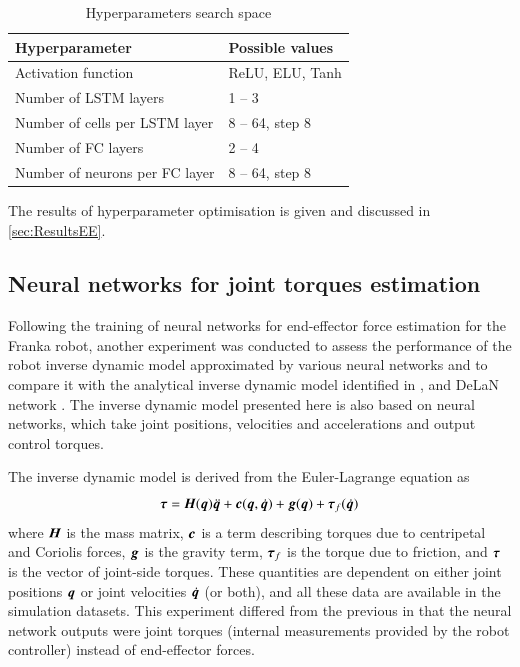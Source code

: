 \begin{table}
    \centering
    \caption{Hyperparameters search space}
    \label{tab:HPSearchSpace}
    \begin{tabular}{ll}
        \toprule
        \textbf{Hyperparameter} & \textbf{Possible values}\\
        \midrule
        Activation function & ReLU, ELU, Tanh \\
        Number of LSTM layers & 1 -- 3 \\ %
        Number of cells per LSTM layer & 8 -- 64, step 8 \\ %
        Number of FC layers & 2 -- 4 \\ %
        Number of neurons per FC layer & 8 -- 64, step 8 \\ %
        \bottomrule
    \end{tabular}
\end{table}

The results of hyperparameter optimisation is given and discussed in \cref{sec:ResultsEE}.

\subsection{Neural networks for joint torques estimation}

Following the training of neural networks for end-effector force estimation for the Franka robot, another experiment was conducted to assess the performance of the robot inverse dynamic model approximated by various neural networks and to compare it with the analytical inverse dynamic model identified in \cite{Gaz2019}, and DeLaN network \cite{Lutter2019}. The inverse dynamic model presented here is also based on neural networks, which take joint positions, velocities and accelerations and output control torques.

The inverse dynamic model is derived from the Euler-Lagrange equation as
\[
    {\bm{\tau}}={\bm{H}}({\bm{q}})\ddot{{\bm{q}}}+{\bm{c}}({\bm{q}},\dot{{\bm{q}}})+{\bm{g}}({\bm{q}})+{\bm{\tau}}_f(\dot{{\bm{q}}})
    \label{eq:InvDyn}
\]
where ${\bm{H}}$ is the mass matrix, ${\bm{c}}$ is a term describing torques due to centripetal and Coriolis forces, ${\bm{g}}$ is the gravity term, ${\bm{\tau}}_f$ is the torque due to friction, and ${\bm{\tau}}$ is the vector of joint-side torques. These quantities are dependent on either joint positions ${\bm{q}}$ or joint velocities $\dot{{\bm{q}}}$ (or both), and all these data are available in the simulation datasets. This experiment differed from the previous in that the neural network outputs were joint torques (internal measurements provided by the robot controller) instead of end-effector forces.

